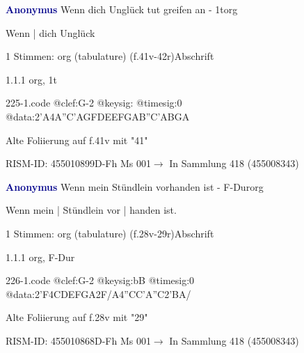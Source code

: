 \documentclass[twocolumn]{book}
\begin{document}
\par \vspace{7pt} \textcolor{darkblue}{\textbf{Anonymus  }}\hfillplus{\textbf{[225]}}\newline Wenn dich Unglück tut greifen an - 1t\newline org
\par \begin{itshape}[f.41v, at left:] Wenn | dich Unglück\end{itshape} 
\par \textcolor{darkblue}{}  1 Stimmen: org (tabulature)  (f.41v-42r)\newline Abschrift
\par 1.1.1  org, 1t  
\begin{filecontents*}{225-1.code}
@clef:G-2
@keysig:
@timesig:0
@data:2'A4A''C'AGFDEEFGAB''C'ABGA
\end{filecontents*}
\newline
%
\par Alte Foliierung auf f.41v mit "41"
\par RISM-ID: 455010899\newline D-Fh  Ms 001\newline $\rightarrow$ In Sammlung 418 (455008343)
      
\par \vspace{7pt} \textcolor{darkblue}{\textbf{Anonymus  }}\hfillplus{\textbf{[226]}}\newline Wenn mein Stündlein vorhanden ist - F-Dur\newline org
\par \begin{itshape}[f.28v, at left:] Wenn mein | Stündlein vor | handen ist.\end{itshape} 
\par \textcolor{darkblue}{}  1 Stimmen: org (tabulature)  (f.28v-29r)\newline Abschrift
\par 1.1.1  org, F-Dur  
\begin{filecontents*}{226-1.code}
@clef:G-2
@keysig:bB
@timesig:0
@data:2'F4CDEFGA2F/A4''CC'A''C2'BA/
\end{filecontents*}
\newline
%
\par Alte Foliierung auf f.28v mit "29"
\par RISM-ID: 455010868\newline D-Fh  Ms 001\newline $\rightarrow$ In Sammlung 418 (455008343)
      
\end{document}
